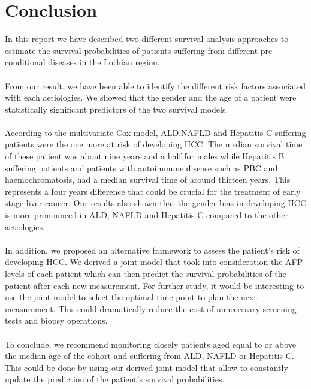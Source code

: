 \documentclass[11pt,twoside]{article}
\numberwithin{Theorem}{section}
\numberwithin{Definition}{section}
\numberwithin{Lemma}{section}
\numberwithin{Algorithm}{section}
\numberwithin{equation}{section}
\begin{document}
\section{Conclusion}
%
%
%
In this report we have described two different survival analysis approaches to estimate the survival probabilities of patients suffering from different pre-conditional diseases in the Lothian region. \\ \\
From our result, we have been able to identify the different risk factors associated with each aetiologies. We showed that the gender and the age of a patient were statistically significant predictors of the two survival models.
\\ \\ According to the multivariate Cox model, ALD,NAFLD and Hepatitis C suffering patients were the one more at risk of developing HCC. The median survival time of these patient was about nine years and a half for males while Hepatitis B suffering patients and patients with autoimmune disease such as PBC and haemochromatosis, had a median survival time of around thirteen years. This represents a four years difference that could be crucial for the treatment of early stage liver cancer. Our results also shown that the gender bias in developing HCC is more pronounced in ALD, NAFLD and Hepatitis C compared to the other aetiologies.  \\ \\
In addition, we proposed an alternative framework to assess the patient's risk of developing HCC. We derived a joint model that took into consideration the AFP levels of each patient which can then predict the survival probabilities of the patient after each new measurement. For further study, it would be interesting to use the joint model to select the optimal time point to plan the next measurement. This could dramatically reduce the cost of unnecessary screening tests and biopsy operations.
\\ \\
To conclude, we recommend monitoring closely patients aged equal to or above the median age of the cohort and suffering from ALD, NAFLD or Hepatitis C. This could be done by using our derived joint model that allow to constantly update the prediction of the patient's survival probabilities.
\clearpage



\clearpage

\appendix
\end{document}
